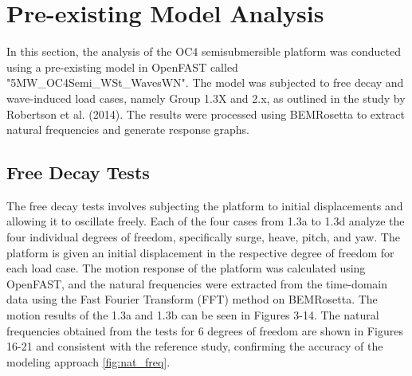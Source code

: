 \documentclass[a4paper, 11pt]{article}
\begin{document}
\section{Pre-existing Model Analysis}

\hspace*{0.5cm}In this section, the analysis of the OC4 semisubmersible platform was conducted using a pre-existing model in OpenFAST called "5MW\_OC4Semi\_WSt\_WavesWN". The model was subjected to free decay and wave-induced load cases, namely Group 1.3X and 2.x, as outlined in the study by Robertson et al. (2014). The results were processed using BEMRosetta to extract natural frequencies and generate response graphs.

\subsection{Free Decay Tests}
\hspace*{0.5cm}The free decay tests involves subjecting the platform to initial displacements and allowing it to oscillate freely. Each of the four cases from 1.3a to 1.3d analyze the four individual degrees of freedom, specifically surge, heave, pitch, and yaw. The platform is given an initial displacement in the respective degree of freedom for each load case. The motion response of the platform was calculated using OpenFAST, and the natural frequencies were extracted from the time-domain data using the Fast Fourier Transform (FFT) method on BEMRosetta. The motion results of the 1.3a and 1.3b can be seen in Figures 3-14. The natural frequencies obtained from the tests for 6 degrees of freedom are shown in Figures 16-21 and consistent with the reference study, confirming the accuracy of the modeling approach \autoref{fig:nat_freq}.
\vspace{0.3cm}
\end{document}
